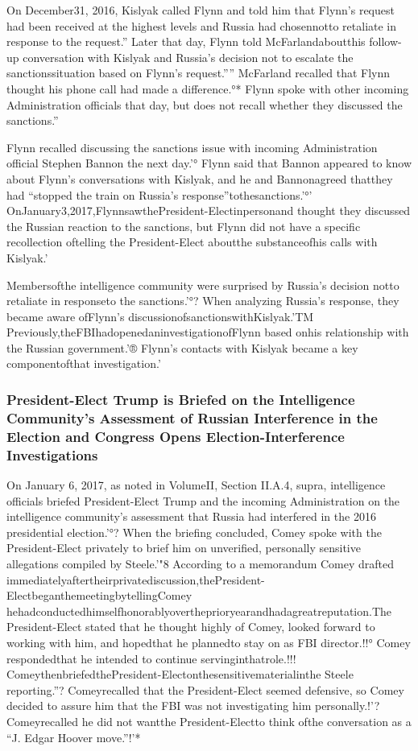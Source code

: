 On December31, 2016, Kislyak called Flynn and told him that Flynn’s request had been received at the highest levels and Russia had chosennotto retaliate in response to the request.” Later that day, Flynn told McFarlandaboutthis follow-up conversation with Kislyak and Russia’s decision not to escalate the sanctionssituation based on Flynn’s request.”” McFarland recalled that Flynn thought his phone call had made a difference.°* Flynn spoke with other incoming Administration officials that day, but does not recall whether they discussed the sanctions.”

Flynn recalled discussing the sanctions issue with incoming Administration official Stephen Bannon the next day.'° Flynn said that Bannon appeared to know about Flynn’s conversations with Kislyak, and he and Bannonagreed thatthey had “stopped the train on Russia’s response”tothesanctions.'°' OnJanuary3,2017,FlynnsawthePresident-Electinpersonand thought they discussed the Russian reaction to the sanctions, but Flynn did not have a specific recollection oftelling the President-Elect aboutthe substanceofhis calls with Kislyak.'

Membersofthe intelligence community were surprised by Russia’s decision notto retaliate in responseto the sanctions.'°? When analyzing Russia’s response, they became aware ofFlynn’s discussionofsanctionswithKislyak.'TM Previously,theFBIhadopenedaninvestigationofFlynn based onhis relationship with the Russian government.'® Flynn’s contacts with Kislyak became a key componentofthat investigation.'

\subsubsection{President-Elect Trump is Briefed on the Intelligence Community's Assessment of Russian Interference in the Election and Congress Opens Election-Interference Investigations}

On January 6, 2017, as noted in VolumeII, Section II.A.4, supra, intelligence officials briefed President-Elect Trump and the incoming Administration on the intelligence community’s assessment that Russia had interfered in the 2016 presidential election.'°? When the briefing concluded, Comey spoke with the President-Elect privately to brief him on unverified, personally sensitive allegations compiled by Steele.'"8 According to a memorandum Comey drafted immediatelyaftertheirprivatediscussion,thePresident-ElectbeganthemeetingbytellingComey hehadconductedhimselfhonorablyovertheprioryearandhadagreatreputation.The President-Elect stated that he thought highly of Comey, looked forward to working with him, and hopedthat he plannedto stay on as FBI director.!!° Comey respondedthat he intended to continue servinginthatrole.!!! ComeythenbriefedthePresident-Electonthesensitivematerialinthe Steele reporting.''? Comeyrecalled that the President-Elect seemed defensive, so Comey decided to assure him that the FBI was not investigating him personally.!'? Comeyrecalled he did not wantthe President-Electto think ofthe conversation as a “J. Edgar Hoover move.”!'*


